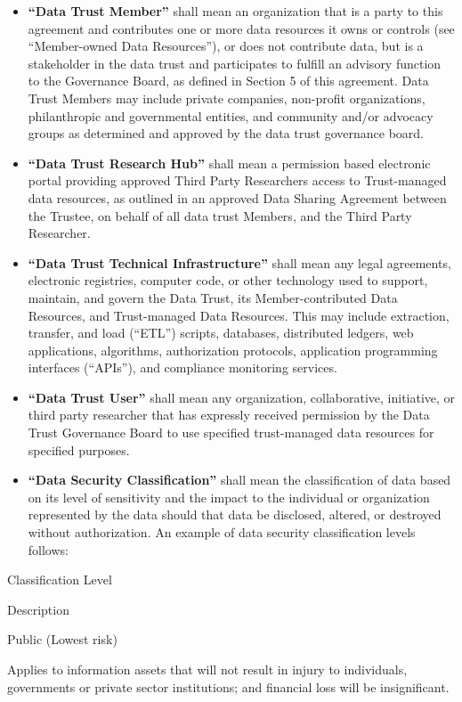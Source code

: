 \documentclass[]{book}
\begin{document}
\begin{itemize}
\item
  \textbf{``Data Trust Member''} shall mean an organization that is a party to this agreement and contributes one or more data resources it owns or controls (see ``Member-owned Data Resources''), or does not contribute data, but is a stakeholder in the data trust and participates to fulfill an advisory function to the Governance Board, as defined in Section 5 of this agreement. Data Trust Members may include private companies, non-profit organizations, philanthropic and governmental entities, and community and/or advocacy groups as determined and approved by the data trust governance board.
\item
  \textbf{``Data Trust Research Hub''} shall mean a permission based electronic portal providing approved Third Party Researchers access to Trust-managed data resources, as outlined in an approved Data Sharing Agreement between the Trustee, on behalf of all data trust Members, and the Third Party Researcher.
\item
  \textbf{``Data Trust Technical Infrastructure''} shall mean any legal agreements, electronic registries, computer code, or other technology used to support, maintain, and govern the Data Trust, its Member-contributed Data Resources, and Trust-managed Data Resources. This may include extraction, transfer, and load (``ETL'') scripts, databases, distributed ledgers, web applications, algorithms, authorization protocols, application programming interfaces (``APIs''), and compliance monitoring services.
\item
  \textbf{``Data Trust User''} shall mean any organization, collaborative, initiative, or third party researcher that has expressly received permission by the Data Trust Governance Board to use specified trust-managed data resources for specified purposes.
\item
  \textbf{``Data Security Classification''} shall mean the classification of data based on its level of sensitivity and the impact to the individual or organization represented by the data should that data be disclosed, altered, or destroyed without authorization. An example of data security classification levels follows:
\end{itemize}

Classification Level

Description

Public (Lowest risk)

Applies to information assets that will not result in injury to individuals, governments or private sector institutions; and financial loss will be insignificant.
\end{document}
